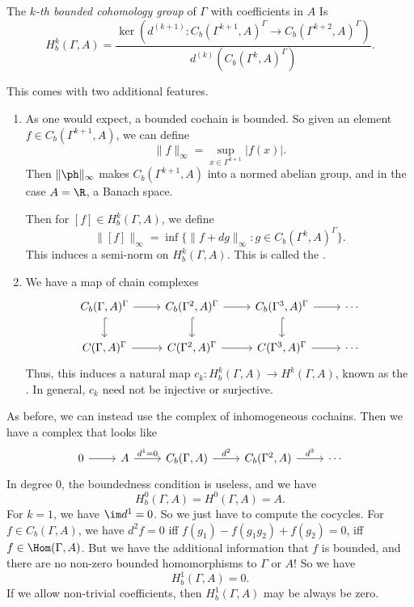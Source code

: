\documentclass[a4paper]{article}
\begin{document}
\begin{defi}
  The \emph{$k$-th bounded cohomology group} of $\Gamma$ with coefficients in $A$ Is
  \[
    H_b^k(\Gamma, A) = \frac{\ker (d^{(k + 1)} : C_b(\Gamma^{k + 1}, A)^\Gamma \to C_b(\Gamma^{k + 2}, A)^\Gamma)}{d^{(k)}(C_b(\Gamma^k, A)^\Gamma)}.
  \]
\end{defi}

This comes with two additional features.
\begin{enumerate}
  \item As one would expect, a bounded cochain is bounded. So given an element $f \in C_b(\Gamma^{k + 1}, A)$, we can define
    \[
      \|f\|_\infty = \sup_{x \in \Gamma^{k + 1}} |f(x)|.
    \]
    Then $\|\ph\|_\infty$ makes $C_b(\Gamma^{k + 1}, A)$ into a normed abelian group, and in the case $A = \R$, a Banach space.

    Then for $[f] \in H^k_b(\Gamma, A)$, we define
    \[
      \|[f]\|_\infty = \inf \{ \|f + d g\|_\infty : g \in C_b(\Gamma^k, A)^\Gamma\}.
    \]
    This induces a semi-norm on $H^k_b(\Gamma, A)$. This is called the .
  \item We have a map of chain complexes
    \[
      \begin{tikzcd}
        C_b(\Gamma, A)^\Gamma \ar[r] \ar[d, hook] & C_b(\Gamma^2, A)^\Gamma \ar[r] \ar[d, hook] & C_b(\Gamma^3, A)^\Gamma \ar[r] \ar[d, hook] & \cdots\\
        C(\Gamma, A)^\Gamma \ar[r] & C(\Gamma^2, A)^\Gamma \ar[r] & C(\Gamma^3, A)^\Gamma \ar[r] & \cdots
      \end{tikzcd}
    \]
    Thus, this induces a natural map $c_k: H^k_b (\Gamma, A) \to H^k(\Gamma, A)$, known as the . In general, $c_k$ need not be injective or surjective.
\end{enumerate}

As before, we can instead use the complex of inhomogeneous cochains. Then we have a complex that looks like
\[
  \begin{tikzcd}
    0 \ar[r] & A \ar[r, "d^1 = 0"] & C_b(\Gamma, A) \ar[r, "d^2"] & C_b(\Gamma^2, A) \ar[r, "d^3"] & \cdots
  \end{tikzcd}
\]
In degree $0$, the boundedness condition is useless, and we have
\[
  H_b^0(\Gamma, A) = H^0(\Gamma, A) = A.
\]
For $k = 1$, we have $\im d^1 = 0$. So we just have to compute the cocycles. For $f \in C_b(\Gamma, A)$, we have $d^2 f = 0$ iff $f(g_1) - f(g_1 g_2) + f(g_2) = 0$, iff $f \in \Hom(\Gamma, A)$. But we have the additional information that $f$ is bounded, and there are no non-zero bounded homomorphisms to $\Gamma$ or $A$! So we have
\[
  H_b^1(\Gamma, A) = 0.
\]
If we allow non-trivial coefficients, then $H^1_b(\Gamma, A)$ may be always be zero.
\end{document}

